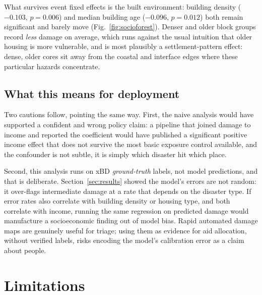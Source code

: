 \documentclass[10pt,twocolumn]{article}
\begin{document}
What survives event fixed effects is the built environment: building density
($-0.103$, $p = 0.006$) and median building age ($-0.096$, $p = 0.012$) both remain significant and
barely move (Fig.~\ref{fig:socioforest}). Denser and older block groups record \emph{less} damage on
average, which runs against the usual intuition that older housing is more vulnerable, and is most
plausibly a settlement-pattern effect: dense, older cores sit away from the coastal and interface
edges where these particular hazards concentrate.

\subsection{What this means for deployment}

Two cautions follow, pointing the same way. First, the naive analysis would have supported a
confident and wrong policy claim: a pipeline that joined damage to income and reported the
coefficient would have published a significant positive income effect that does not survive the most
basic exposure control available, and the confounder is not subtle, it is simply which disaster hit
which place.

Second, this analysis runs on xBD \emph{ground-truth} labels, not model predictions, and that is
deliberate. Section~\ref{sec:results} showed the model's errors are not random: it over-flags
intermediate damage at a rate that depends on the disaster type. If error rates also correlate with
building density or housing type, and both correlate with income, running the same regression on
predicted damage would manufacture a socioeconomic finding out of model bias. Rapid automated damage
maps are genuinely useful for triage; using them as evidence for aid allocation, without verified
labels, risks encoding the model's calibration error as a claim about people.

\section{Limitations}
\end{document}
